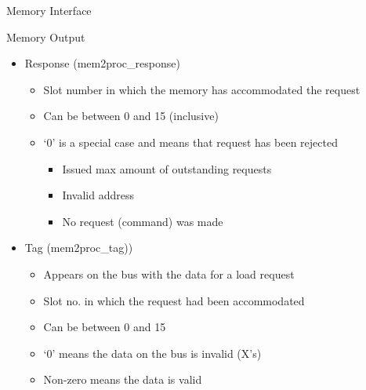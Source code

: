 \documentclass[table,dvipsnames]{beamer}
\begin{document}
\begin{frame}[fragile]{Memory Interface}
	\begin{block}{Memory Output}
	\begin{itemize}
		\item Response (mem2proc\_response)
		\begin{itemize}
			\item Slot number in which the memory has accommodated the request
			\item Can be between 0 and 15 (inclusive)
			\item `0' is a special case and means that request has been rejected
			\begin{itemize}
				\item Issued max amount of outstanding requests
				\item Invalid address
				\item No request (command) was made
			\end{itemize}
		\end{itemize}
		\item Tag (mem2proc\_tag))
		\begin{itemize}
			\item Appears on the bus with the data for a load request
			\item Slot no. in which the request had been accommodated
			\item Can be between 0 and 15
			\item `0' means the data on the bus is invalid (X's)
			\item Non-zero means the data is valid
		\end{itemize}
	\end{itemize}
	\end{block}
\end{frame}
\end{document}
